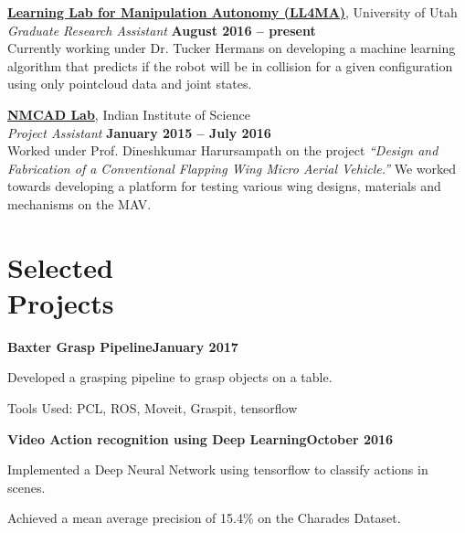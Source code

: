 \documentclass[letterpaper, margin, line]{resume}
\begin{document}
\begin{resume}
    \href{https://robot-learning.cs.utah.edu}{\textbf{Learning Lab for Manipulation Autonomy (LL4MA)}}, University of Utah \vspace{1pt}\\\vspace{1pt}%
    \textsl{Graduate Research Assistant} \hfill \textbf{August 2016 -- present}\\
Currently working under Dr. Tucker Hermans on developing a machine learning algorithm that predicts if the robot will be in collision for a given configuration using only pointcloud data and joint states.


    \href{http://www.aero.iisc.ernet.in/~dinesh/web/}{\textbf{NMCAD Lab}}, Indian Institute of Science \vspace{1pt}\\\vspace{1pt}%
    \textsl{Project Assistant} \hfill \textbf{January 2015 -- July 2016}\\
    Worked under Prof. Dineshkumar Harursampath on the project \textit{``Design and Fabrication of a Conventional Flapping Wing Micro Aerial Vehicle.''} We worked towards developing a platform for testing various wing designs, materials and mechanisms on the MAV.

    
	\section{\mysidestyle Selected\\Projects}
	
	\textbf{Baxter Grasp Pipeline}\hfill \textbf{January 2017}
    \begin{list2}
	\item Developed a grasping pipeline to grasp objects on a table.
	\item Tools Used: PCL, ROS, Moveit, Graspit, tensorflow
	\end{list2}\vspace{-1.5mm}

	\textbf{Video Action recognition using Deep Learning}\hfill \textbf{October 2016}
	\begin{list2}
	\item Implemented a Deep Neural Network using tensorflow to classify actions in scenes.
	\item Achieved a mean average precision of 15.4\% on the Charades Dataset.
	\end{list2}
	



\end{resume}
\end{document}
